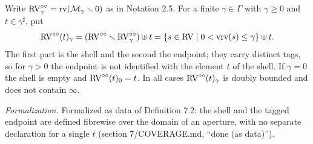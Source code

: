 \setcounter{theorem}{0}
\begin{definition}
\label{punc-RVd}
\leanok
{}
Write $\mathrm{RV}^{\circ\circ}_\gamma = \operatorname{rv}(\mathcal{M}_\gamma \smallsetminus 0)$ as in Notation 2.5. For a finite $\gamma \in \Gamma$ with $\gamma \geq 0$ and $t \in \gamma^\sharp$, put\[ \mathrm{RV}^{\circ\circ}(t)_\gamma = (\mathrm{RV}^{\circ\circ} \smallsetminus \mathrm{RV}^{\circ\circ}_\gamma) \uplus t = \{ s \in \mathrm{RV} \mid 0 < \operatorname{vrv}(s) \leq \gamma \} \uplus t. \]The first part is the shell and the second the endpoint; they carry distinct tags, so for $\gamma > 0$ the endpoint is not identified with the element $t$ of the shell. If $\gamma = 0$ the shell is empty and $\mathrm{RV}^{\circ\circ}(t)_0 = t$. In all cases $\mathrm{RV}^{\circ\circ}(t)_\gamma$ is doubly bounded and does not contain $\infty$.

\emph{Formalization.} Formalized as data of Definition 7.2: the shell and the tagged endpoint are defined fibrewise over the domain of an aperture, with no separate declaration for a single $t$ (section 7/COVERAGE.md, ``done (as data)'').
\end{definition}

